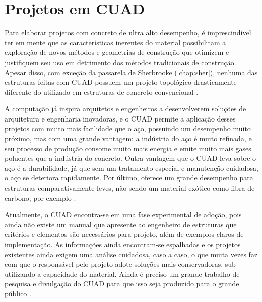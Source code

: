 \chapter{Projetos em CUAD}

Para elaborar projetos com concreto de ultra alto desempenho, é imprescindível ter em mente que as características inerentes do material possibilitam a exploração de novos métodos e geometrias de construção que otimizem e justifiquem seu uso em detrimento dos métodos tradicionais de construção. Apesar disso, com exceção da passarela de Sherbrooke (\autoref{chap:sher}), nenhuma das estruturas feitas com CUAD possuem um projeto topológico drasticamente diferente do utilizado em estruturas de concreto convencional \cite[p.~603]{Flint}.


A computação já inspira arquitetos e engenheiros a desenvolverem soluções de arquitetura e engenharia inovadoras, e o CUAD permite a aplicação desses projetos com muito mais facilidade que o aço, possuindo um desempenho muito próximo, mas com uma grande vantagem: a indústria do aço é muito refinada, e seu processo de produção consome muito mais energia e emite muito mais gases poluentes que a indústria do concreto. Outra vantagem que o CUAD leva sobre o aço é a durabilidade, já que sem um tratamento especial e manutenção cuidadosa, o aço se deteriora rapidamente. Por último, oferece um grande desempenho para estruturas comparativamente leves, não sendo um material exótico como fibra de carbono, por exemplo \cite[p.~11]{Davila}.

Atualmente, o CUAD encontra-se em uma fase experimental de adoção, pois ainda não existe um manual que apresente ao engenheiro de estruturas que critérios e elementos são necessários para projeto, além de exemplos claros de implementação. As informações ainda encontram-se espalhadas e os projetos existentes ainda exigem uma análise cuidadosa, caso a caso, o que muita vezes faz com que o responsável pelo projeto adote soluções mais conservadoras, sub-utilizando a capacidade do material. Ainda é preciso um grande trabalho de pesquisa e divulgação do CUAD para que isso seja produzido para o grande público \cite[p.~13]{Davila}.

